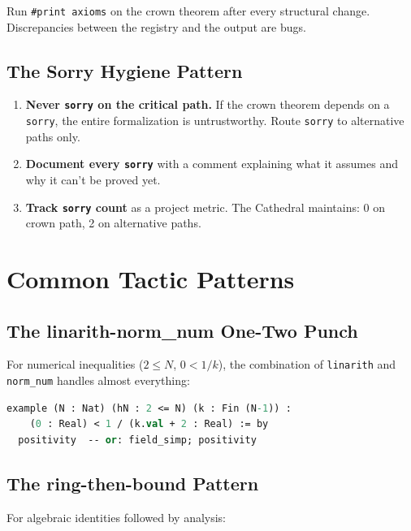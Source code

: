 \documentclass[11pt,a4paper]{article}
\newcommand{\lean}[1]{\texttt{#1}}
\begin{document}
Run \lean{\#print axioms} on the crown theorem after every
structural change. Discrepancies between the registry and the
output are bugs.

\subsection{The Sorry Hygiene Pattern}

\begin{enumerate}
  \item \textbf{Never \lean{sorry} on the critical path.} If the
    crown theorem depends on a \lean{sorry}, the entire formalization
    is untrustworthy. Route \lean{sorry} to alternative paths only.
  \item \textbf{Document every \lean{sorry}} with a comment explaining
    what it assumes and why it can't be proved yet.
  \item \textbf{Track \lean{sorry} count} as a project metric.
    The Cathedral maintains: 0 on crown path, 2 on alternative paths.
\end{enumerate}

\section{Common Tactic Patterns}
\label{sec:tactics}

\subsection{The linarith-norm\_num One-Two Punch}

For numerical inequalities ($2 \leq N$, $0 < 1/k$), the combination
of \lean{linarith} and \lean{norm\_num} handles almost everything:

\begin{lstlisting}[language=ML,caption={Numerical inequality dispatch}]
example (N : Nat) (hN : 2 <= N) (k : Fin (N-1)) :
    (0 : Real) < 1 / (k.val + 2 : Real) := by
  positivity  -- or: field_simp; positivity
\end{lstlisting}

\subsection{The ring-then-bound Pattern}

For algebraic identities followed by analysis:
\end{document}

